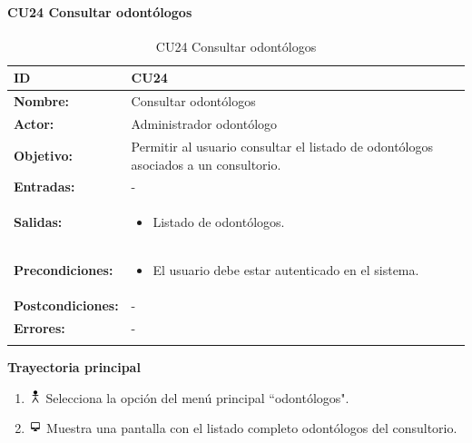 
\paragraph{CU24 Consultar odontólogos}

\begin{longtable}[H]{|p{}|p{12cm}|}
\hline\textbf{ID}         
& \textbf{CU24}            \\ \hline
\textbf{Nombre:}          
& Consultar odontólogos      \\ \hline
\textbf{Actor:}          
& Administrador odontólogo   \\ \hline
\textbf{Objetivo:}       
& Permitir al usuario consultar el listado de odontólogos asociados a  un consultorio.\\ \hline
\textbf{Entradas:}  &   -
\\ \hline
\textbf{Salidas:}  &             
\begin{itemize}[nosep]
\item Listado de odontólogos.
\end{itemize}
\\ \hline
\textbf{Precondiciones:}  &             
\begin{itemize}[nosep]
\item El usuario debe estar autenticado en el sistema.
\end{itemize}
\\ \hline
\textbf{Postcondiciones:} &  -
\\ \hline 
\textbf{Errores:} &  -
\\ \hline
\caption{CU24 Consultar odontólogos}
\label{table:1}
\end{longtable}

\textbf{Trayectoria principal}
\begin{enumerate}
\item \includegraphics[height=1em]{pictures/actor.png} Selecciona la opción del menú principal ``odontólogos".
\item \includegraphics[height=1em]{pictures/sistema.png} Muestra una pantalla con el listado completo odontólogos del consultorio.
\end{enumerate} \bigskip


